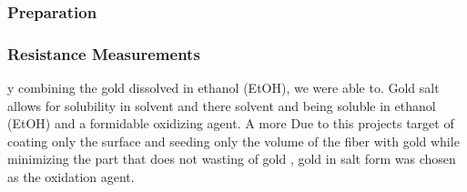\subsubsection{Preparation}

\subsubsection{Resistance Measurements}

y combining the gold dissolved in ethanol (EtOH), we were able to. Gold salt allows for solubility in solvent and there solvent and  being soluble in ethanol (EtOH) and a formidable oxidizing agent. A more 
Due to this projects target of coating only the surface and seeding only the volume of the fiber with gold while minimizing the part that does not wasting of gold , gold in salt form was chosen as the oxidation agent.